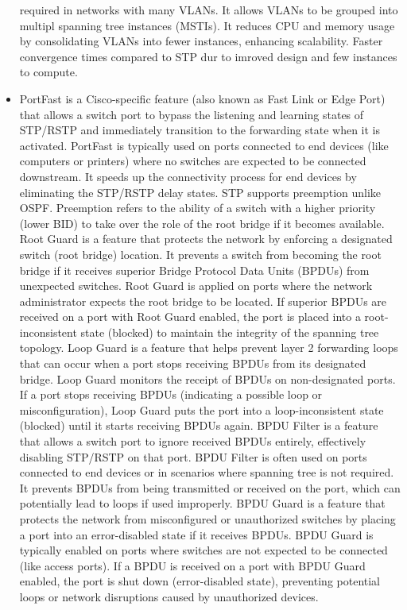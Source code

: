 \documentclass{article}
\begin{document}
\begin{itemize}
required in networks with many VLANs. It allows VLANs to be grouped into multipl spanning tree instances (MSTIs). It reduces CPU and memory usage by consolidating VLANs into fewer instances, enhancing scalability. Faster convergence times compared to STP dur to imroved design and few instances to compute.
	\item[] PortFast is a Cisco-specific feature (also known as Fast Link or Edge Port) that allows a switch port to bypass the listening and learning states of STP/RSTP and immediately transition to the forwarding state when it is activated. PortFast is typically used on ports connected to end devices (like computers or printers) where no switches are expected to be connected downstream. It speeds up the connectivity process for end devices by eliminating the STP/RSTP delay states. STP supports preemption unlike OSPF. Preemption refers to the ability of a switch with a higher priority (lower BID) to take over the role of the root bridge if it becomes available. Root Guard is a feature that protects the network by enforcing a designated switch (root bridge) location. It prevents a switch from becoming the root bridge if it receives superior Bridge Protocol Data Units (BPDUs) from unexpected switches. Root Guard is applied on ports where the network administrator expects the root bridge to be located. If superior BPDUs are received on a port with Root Guard enabled, the port is placed into a root-inconsistent state (blocked) to maintain the integrity of the spanning tree topology. Loop Guard is a feature that helps prevent layer 2 forwarding loops that can occur when a port stops receiving BPDUs from its designated bridge. Loop Guard monitors the receipt of BPDUs on non-designated ports. If a port stops receiving BPDUs (indicating a possible loop or misconfiguration), Loop Guard puts the port into a loop-inconsistent state (blocked) until it starts receiving BPDUs again. BPDU Filter is a feature that allows a switch port to ignore received BPDUs entirely, effectively disabling STP/RSTP on that port. BPDU Filter is often used on ports connected to end devices or in scenarios where spanning tree is not required. It prevents BPDUs from being transmitted or received on the port, which can potentially lead to loops if used improperly. BPDU Guard is a feature that protects the network from misconfigured or unauthorized switches by placing a port into an error-disabled state if it receives BPDUs. BPDU Guard is typically enabled on ports where switches are not expected to be connected (like access ports). If a BPDU is received on a port with BPDU Guard enabled, the port is shut down (error-disabled state), preventing potential loops or network disruptions caused by unauthorized devices.
  

\end{itemize}
\end{document}

